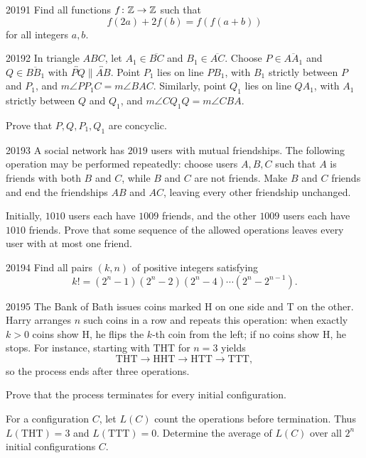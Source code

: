 
\begin{problem}{2019}{1}
Find all functions $f\colon\mathbb{Z}\to\mathbb{Z}$ such that
\[
    f(2a)+2f(b)=f(f(a+b))
\]
for all integers $a, b$.
\end{problem}

\begin{problem}{2019}{2}
In triangle $ABC$, let $A_1\in\overline{BC}$ and $B_1\in\overline{AC}$. Choose $P\in\overline{AA_1}$ and $Q\in\overline{BB_1}$ with $\overleftrightarrow{PQ}\parallel\overleftrightarrow{AB}$. Point $P_1$ lies on line $PB_1$, with $B_1$ strictly between $P$ and $P_1$, and $m\angle PP_1C=m\angle BAC$. Similarly, point $Q_1$ lies on line $QA_1$, with $A_1$ strictly between $Q$ and $Q_1$, and $m\angle CQ_1Q=m\angle CBA$.

Prove that $P, Q, P_1, Q_1$ are concyclic.
\end{problem}

\begin{problem}{2019}{3}
A social network has $2019$ users with mutual friendships. The following operation may be performed repeatedly: choose users $A, B, C$ such that $A$ is friends with both $B$ and $C$, while $B$ and $C$ are not friends. Make $B$ and $C$ friends and end the friendships $AB$ and $AC$, leaving every other friendship unchanged.

Initially, $1010$ users each have $1009$ friends, and the other $1009$ users each have $1010$ friends. Prove that some sequence of the allowed operations leaves every user with at most one friend.
\end{problem}

\begin{problem}{2019}{4}
Find all pairs $(k, n)$ of positive integers satisfying
\[
    k!=(2^n-1)(2^n-2)(2^n-4)\cdots(2^n-2^{n-1}).
\]
\end{problem}

\begin{problem}{2019}{5}
The Bank of Bath issues coins marked $\mathrm{H}$ on one side and $\mathrm{T}$ on the other. Harry arranges $n$ such coins in a row and repeats this operation: when exactly $k>0$ coins show $\mathrm{H}$, he flips the $k$-th coin from the left; if no coins show $\mathrm{H}$, he stops. For instance, starting with $\mathrm{THT}$ for $n=3$ yields
\[
    \mathrm{THT}\to\mathrm{HHT}\to\mathrm{HTT}\to\mathrm{TTT},
\]
so the process ends after three operations.
\begin{problemsubparts}
    \item Prove that the process terminates for every initial configuration.
    \item For a configuration $C$, let $L(C)$ count the operations before termination. Thus $L(\mathrm{THT})=3$ and $L(\mathrm{TTT})=0$. Determine the average of $L(C)$ over all $2^n$ initial configurations $C$.
\end{problemsubparts}
\end{problem}

